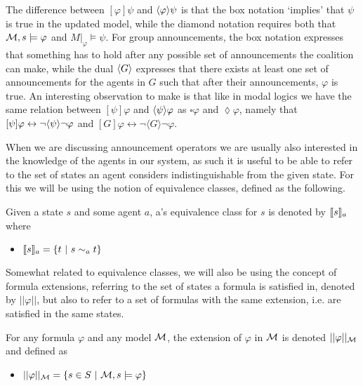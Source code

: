 The difference between $[\varphi]\psi$ and $\langle\varphi\rangle\psi$ is that the box notation `implies' that $\psi$ is true in the updated model, while the diamond notation requires both that $\mathcal{M},s\models \varphi$ and $M|_\varphi \models \psi$. For group announcements, the box notation expresses that something has to hold after any possible set of announcements the coalition can make, while the dual $\langle G\rangle$ expresses that there exists at least one set of announcements for the agents in $G$ such that after their announcements, $\varphi$ is true. An interesting observation to make is that like in modal logics we have the same relation between $[\psi]\varphi$ and $\langle\psi\rangle\varphi$ as $\square\varphi$ and $\lozenge\varphi$, namely that $[\psi]\varphi \leftrightarrow \neg\langle\psi\rangle\neg\varphi$ and $[G]\varphi \leftrightarrow \neg\langle G\rangle\neg\varphi$.

When we are discussing announcement operators we are usually also interested in the knowledge of the agents in our system, as such it is useful to be able to refer to the set of states an agent considers indistinguishable from the given state. For this we will be using the notion of equivalence classes, defined as the following.

\begin{definition}
	\label{def:eqclass}
	Given a state $s$ and some agent $a$, a's equivalence class for $s$ is denoted by $\llbracket s\rrbracket_a$ where
	\begin{itemize}
		\item[] $\llbracket s\rrbracket_a = \{t~|~s\sim_a t\}$
	\end{itemize}
\end{definition}

Somewhat related to equivalence classes, we will also be using the concept of formula extensions, referring to the set of states a formula is satisfied in, denoted by $||\varphi||$, but also to refer to a set of formulas with the same extension, i.e. are satisfied in the same states.

\begin{definition}
	\label{def:ext}
	For any formula $\varphi$ and any model $\mathcal{M}$, the extension of $\varphi$ in $\mathcal{M}$ is denoted $||\varphi||_{\mathcal{M}}$ and defined as
	\begin{itemize}
		\item[] $||\varphi||_{\mathcal{M}} = \{s\in S ~|~\mathcal{M},s\models\varphi\}$
	\end{itemize}
\end{definition}

